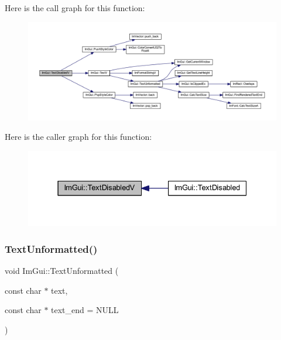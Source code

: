 Here is the call graph for this function\+:
\nopagebreak
\begin{figure}[H]
\begin{center}
\leavevmode
\includegraphics[width=350pt]{namespace_im_gui_a5b128d4f12d7e33e95fb9cef7dce027e_cgraph}
\end{center}
\end{figure}
Here is the caller graph for this function\+:
\nopagebreak
\begin{figure}[H]
\begin{center}
\leavevmode
\includegraphics[width=331pt]{namespace_im_gui_a5b128d4f12d7e33e95fb9cef7dce027e_icgraph}
\end{center}
\end{figure}
\mbox{\label{namespace_im_gui_a96a5f42789ecc419b2ae8af7b2acc28e}} 
\subsubsection{\texorpdfstring{Text\+Unformatted()}{TextUnformatted()}}
{\footnotesize\ttfamily void Im\+Gui\+::\+Text\+Unformatted (\begin{DoxyParamCaption}\item[{const char $\ast$}]{text,  }\item[{const char $\ast$}]{text\+\_\+end = {\ttfamily NULL} }\end{DoxyParamCaption})}

